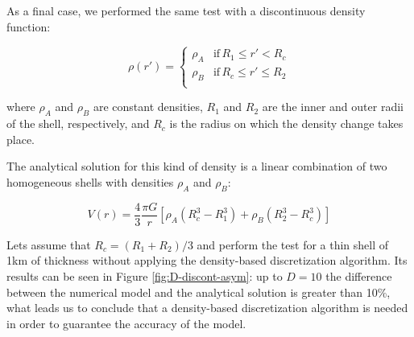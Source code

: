 \documentclass[extra]{gji}
\begin{document}
As a final case, we performed the same test with a discontinuous density function:

\begin{equation}
    \rho(r') = 
    \begin{cases}
        \rho_A & \text{if} \, R_1 \leq r' < R_c \\
        \rho_B & \text{if} \, R_c \leq r' \leq R_2 \\
    \end{cases}
\label{eq:density-discontinuous}
\end{equation}

\noindent where $\rho_A$ and $\rho_B$ are constant densities, $R_1$ and $R_2$ are the inner and outer radii of the shell, respectively, and $R_c$ is the radius on which the density change takes place.

The analytical solution for this kind of density is a linear combination of two homogeneous shells with densities $\rho_A$ and $\rho_B$:

\begin{equation}
    V(r) = \frac{4}{3} \frac{\pi G}{r}
    \left[ \rho_A (R_c^3 - R_1^3) +
    \rho_B (R_2^3 - R_c^3) \right]
\end{equation}

Lets assume that $R_c = (R_1 + R_2)/3$ and perform the test for a thin shell of 1km of thickness without applying the density-based discretization algorithm.
Its results can be seen in Figure \ref{fig:D-discont-asym}: up to $D=10$ the difference between the numerical model and the analytical solution is greater than 10\%, what leads us to conclude that a density-based discretization algorithm is needed in order to guarantee the accuracy of the model.
\end{document}
